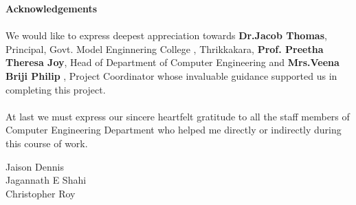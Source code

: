 \documentclass[11pt]{report}
\begin{document}
\begin{center}
	\thispagestyle{empty}
	\LARGE{\textbf{Acknowledgements}}\\[1cm]
\end{center}
\linespread{1.13}
\large{\paragraph{}We would like to express deepest appreciation towards \textbf{Dr.Jacob Thomas},
	Principal, Govt. Model Enginnering College , Thrikkakara, \textbf{Prof. Preetha Theresa Joy}, 
	Head of Department of Computer Engineering and \textbf{Mrs.Veena Briji Philip }, Project Coordinator whose
	invaluable guidance supported us in completing this project.}
\large{\paragraph{}At last we must express our sincere heartfelt gratitude to all the staff members
	of Computer Engineering Department who helped me directly or indirectly during this course of work.}
\begin{flushright}
	{
		Jaison Dennis\\
		Jagannath E Shahi\\
		Christopher Roy
	}
\end{flushright}
\newpage
 
\begin{abstract}
This project 'E-Mart' is an e-commerce platform  which sells its goods and services online making it easier for the user to access a wide variety of items from a single platform. E-Mart allows customers to browse and purchase products from a variety of sellers through a web browser. The platform handles all aspects of the transaction, including payment processing, order fulfillment, and order tracking. The platform may also offer features such as personalized recommendations, wish lists, and reviews to help customers find the products they are looking for. Users can also add products to cart and buy them at a later time. Users can search and filter products based on price, brand and offers. Our platform is open for both end users and sellers. The goal of the platform is to create a convenient and easy-to-use shopping experience for customers, while also providing a means for sellers to reach a larger audience and grow their businesses.
\end{abstract}

\tableofcontents
\end{document}
